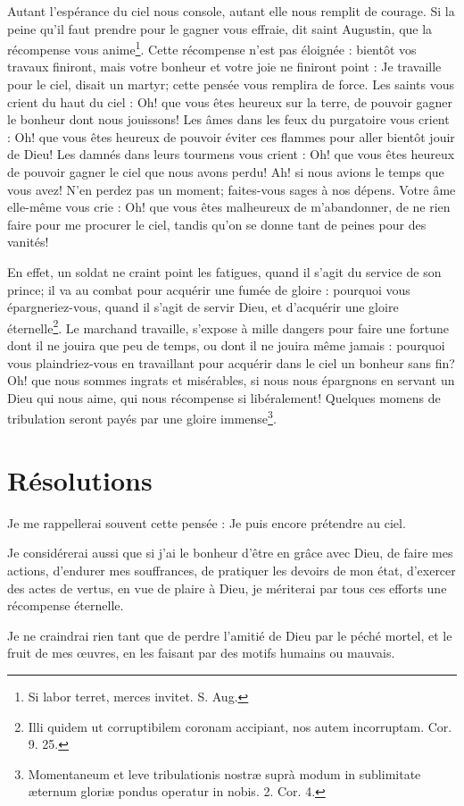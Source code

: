 \documentclass[instructions.tex]{subfiles}
\begin{document}
Autant l'espérance du ciel nous console, autant elle nous remplit de courage. Si la peine qu'il faut prendre pour le gagner vous effraie, dit saint Augustin, que la récompense vous anime\footnote{Si labor terret, merces invitet. S. Aug.}. Cette récompense n'est pas éloignée : bientôt vos travaux finiront, mais votre bonheur et votre joie ne finiront point : Je travaille pour le ciel, disait un martyr; cette pensée vous remplira de force. Les saints vous crient du haut du ciel : Oh! que vous êtes heureux sur la terre, de pouvoir gagner le bonheur dont nous jouissons! Les âmes dans les feux du purgatoire vous crient : Oh! que vous êtes heureux de pouvoir éviter ces flammes pour aller bientôt jouir de Dieu! Les damnés dans leurs tourmens vous crient : Oh! que vous êtes heureux de pouvoir gagner le ciel que nous avons perdu! Ah! si nous avions le temps que vous avez! N'en perdez pas un moment; faites-vous sages à nos dépens. Votre âme elle-même vous crie : Oh! que vous êtes malheureux de m'abandonner, de ne rien faire pour me procurer le ciel, tandis qu'on se donne tant de peines pour des vanités!
 
En effet, un soldat ne craint point les fatigues, quand il s'agit du service de son prince; il va au combat pour acquérir une fumée de gloire : pourquoi vous épargneriez-vous, quand il s'agit de servir Dieu, et d'acquérir une gloire éternelle\footnote{Illi quidem ut corruptibilem coronam accipiant, nos autem incorruptam. Cor. 9. 25.}. Le marchand travaille, s'expose à mille dangers pour faire une fortune dont il ne jouira que peu de temps, ou dont il ne jouira même jamais : pourquoi vous plaindriez-vous en travaillant pour acquérir dans le ciel un bonheur sans fin? Oh! que nous sommes ingrats et misérables, si nous nous épargnons en servant un Dieu qui nous aime, qui nous récompense si libéralement! Quelques momens de tribulation seront payés par une gloire immense\footnote{Momentaneum et leve tribulationis nostræ suprà modum in sublimitate æternum gloriæ pondus operatur in nobis. 2. Cor. 4.}.
 
\section{Résolutions}
 
\primo Je me rappellerai souvent cette pensée : Je puis encore prétendre au ciel.
 
\secundo Je considérerai aussi que si j'ai le bonheur d'être en grâce avec Dieu, de faire mes actions, d'endurer mes souffrances, de pratiquer les devoirs de mon état, d'exercer des actes de vertus, en vue de plaire à Dieu, je mériterai par tous ces efforts une récompense éternelle.
 
\tertio Je ne craindrai rien tant que de perdre l'amitié de Dieu par le péché mortel, et le fruit de mes œuvres, en les faisant par des motifs humains ou mauvais.
 
 
\end{document}
